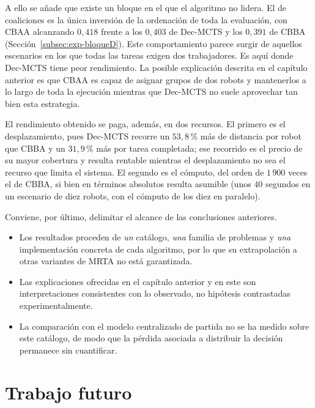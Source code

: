 A ello se añade que existe un bloque en el que el algoritmo no lidera. El de coaliciones es la única inversión de la ordenación de toda la evaluación, con CBAA alcanzando $0{,}418$ frente a los $0{,}403$ de Dec-MCTS y los $0{,}391$ de CBBA (Sección~\ref{subsec:exp-bloqueD}). Este comportamiento parece surgir de aquellos escenarios en los que todas las tareas exigen dos trabajadores. Es aquí donde Dec-MCTS tiene peor rendimiento. La posible explicación descrita en el capítulo anterior es que CBAA es capaz de asignar grupos de dos robots y mantenerlos a lo largo de toda la ejecución mientras que Dec-MCTS no suele aprovechar tan bien esta estrategia.

El rendimiento obtenido se paga, además, en dos recursos. El primero es el desplazamiento, pues Dec-MCTS recorre un $53{,}8\,\text{\%}$ más de distancia por robot que CBBA y un $31{,}9\,\text{\%}$ más por tarea completada; ese recorrido es el precio de su mayor cobertura y resulta rentable mientras el desplazamiento no sea el recurso que limita el sistema. El segundo es el cómputo, del orden de $1\,900$ veces el de CBBA, si bien en términos absolutos resulta asumible (unos $40$ segundos en un escenario de diez robots, con el cómputo de los diez en paralelo).

Conviene, por último, delimitar el alcance de las conclusiones anteriores.
\begin{itemize}
    \item Los resultados proceden de \emph{un} catálogo, \emph{una} familia de problemas y \emph{una} implementación concreta de cada algoritmo, por lo que su extrapolación a otras variantes de MRTA no está garantizada.
    \item Las explicaciones ofrecidas en el capítulo anterior y en este son interpretaciones consistentes con lo observado, no hipótesis contrastadas experimentalmente.
    \item La comparación con el modelo centralizado de partida no se ha medido sobre este catálogo, de modo que la pérdida asociada a distribuir la decisión permanece sin cuantificar.
\end{itemize}


\section{Trabajo futuro} \label{sec:conc-futuro}

